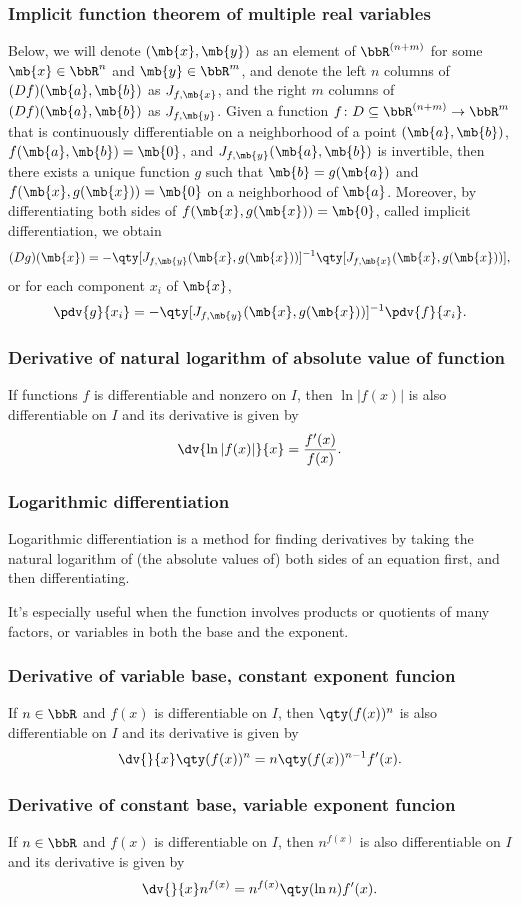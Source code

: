 \documentclass[a4paper,12pt]{report}
\begin{document}
\begin{itemize}
\begin{itemize}
\subsubsection{Implicit function theorem of multiple real variables}
Below, we will denote $(\mb{x},\mb{y})$ as an element of $\bbR^{(n+m)}$ for some $\mb{x}\in\bbR^n$ and $\mb{y}\in\bbR^m$, and denote the left $n$ columns of $(Df)(\mb{a},\mb{b})$ as $J_{f,\mb{x}}$, and the right $m$ columns of $(Df)(\mb{a},\mb{b})$ as $J_{f,\mb{y}}$. Given a function $f\colon D\subseteq\bbR^{(n+m)}\to\bbR^m$ that is continuously differentiable on a neighborhood of a point $(\mb{a},\mb{b})$, $f(\mb{a},\mb{b})=\mb{0}$, and $J_{f,\mb{y}}(\mb{a},\mb{b})$ is invertible, then there exists a unique function $g$ such that $\mb{b}=g(\mb{a})$ and $f(\mb{x},g(\mb{x}))=\mb{0}$ on a neighborhood of $\mb{a}$. Moreover, by differentiating both sides of $f(\mb{x},g(\mb{x}))=\mb{0}$, called implicit differentiation, we obtain
\[(Dg)(\mb{x})=-\qty[J_{f,\mb{y}}(\mb{x},g(\mb{x}))]^{-1}\qty[J_{f,\mb{x}}(\mb{x},g(\mb{x}))],\]
or for each component $x_i$ of $\mb{x}$,
\[\pdv{g}{x_i}=-\qty[J_{f,\mb{y}}(\mb{x},g(\mb{x}))]^{-1}\pdv{f}{x_i}.\]
\subsubsection{Derivative of natural logarithm of absolute value of function}
If functions $f$ is differentiable and nonzero on $I$, then $\ln|f(x)|$ is also differentiable on $I$ and its derivative is given by
\[\dv{\ln|f(x)|}{x}=\frac{f'(x)}{f(x)}.\]
\subsubsection{Logarithmic differentiation}
Logarithmic differentiation is a method for finding derivatives by taking the natural logarithm of (the absolute values of) both sides of an equation first, and then differentiating.

It’s especially useful when the function involves products or quotients of many factors, or variables in both the base and the exponent.
\subsubsection{Derivative of variable base, constant exponent funcion}
If $n\in\bbR$ and $f(x)$ is differentiable on $I$, then $\qty(f(x))^n$ is also differentiable on $I$ and its derivative is given by
\[\dv{}{x}\qty(f(x))^n=n\qty(f(x))^{n-1}f'(x).\]
\subsubsection{Derivative of constant base, variable exponent funcion}
If $n\in\bbR$ and $f(x)$ is differentiable on $I$, then $n^{f(x)}$ is also differentiable on $I$ and its derivative is given by
\[\dv{}{x}n^{f(x)}=n^{f(x)}\qty(\ln n)f'(x).\]

\end{itemize}
\end{itemize}
\end{document}
